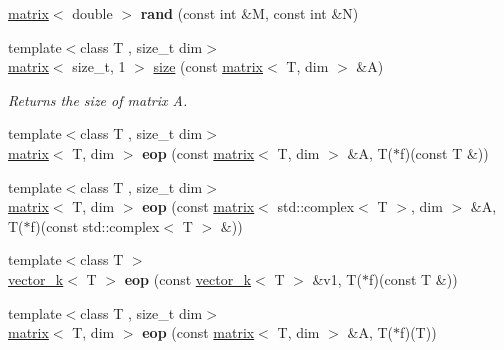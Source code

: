 \begin{DoxyCompactItemize}
\item 
\hypertarget{namespacekeycpp_ae5c4b142a4101e9bb1df9f19efaf7d2f}{\hyperlink{classkeycpp_1_1matrix}{matrix}$<$ double $>$ {\bfseries rand} (const int \&M, const int \&N)}\label{namespacekeycpp_ae5c4b142a4101e9bb1df9f19efaf7d2f}

\item 
{\footnotesize template$<$class T , size\-\_\-t dim$>$ }\\\hyperlink{classkeycpp_1_1matrix}{matrix}$<$ size\-\_\-t, 1 $>$ \hyperlink{namespacekeycpp_acfe17126168656af54ae76ab6c487407}{size} (const \hyperlink{classkeycpp_1_1matrix}{matrix}$<$ T, dim $>$ \&A)
\begin{DoxyCompactList}\small\item\em Returns the size of matrix A. \end{DoxyCompactList}\item 
\hypertarget{namespacekeycpp_ac999bd518fb456aa9a4fbd2c04f007de}{{\footnotesize template$<$class T , size\-\_\-t dim$>$ }\\\hyperlink{classkeycpp_1_1matrix}{matrix}$<$ T, dim $>$ {\bfseries eop} (const \hyperlink{classkeycpp_1_1matrix}{matrix}$<$ T, dim $>$ \&A, T($\ast$f)(const T \&))}\label{namespacekeycpp_ac999bd518fb456aa9a4fbd2c04f007de}

\item 
\hypertarget{namespacekeycpp_a0865e2c884915d6ed0e3ef7bf73438b0}{{\footnotesize template$<$class T , size\-\_\-t dim$>$ }\\\hyperlink{classkeycpp_1_1matrix}{matrix}$<$ T, dim $>$ {\bfseries eop} (const \hyperlink{classkeycpp_1_1matrix}{matrix}$<$ std\-::complex$<$ T $>$, dim $>$ \&A, T($\ast$f)(const std\-::complex$<$ T $>$ \&))}\label{namespacekeycpp_a0865e2c884915d6ed0e3ef7bf73438b0}

\item 
\hypertarget{namespacekeycpp_a6c6542964c7aaaccbee336567f64c03c}{{\footnotesize template$<$class T $>$ }\\\hyperlink{classkeycpp_1_1vector__k}{vector\-\_\-k}$<$ T $>$ {\bfseries eop} (const \hyperlink{classkeycpp_1_1vector__k}{vector\-\_\-k}$<$ T $>$ \&v1, T($\ast$f)(const T \&))}\label{namespacekeycpp_a6c6542964c7aaaccbee336567f64c03c}

\item 
\hypertarget{namespacekeycpp_a46e135aeca12d58b9a084413bf571783}{{\footnotesize template$<$class T , size\-\_\-t dim$>$ }\\\hyperlink{classkeycpp_1_1matrix}{matrix}$<$ T, dim $>$ {\bfseries eop} (const \hyperlink{classkeycpp_1_1matrix}{matrix}$<$ T, dim $>$ \&A, T($\ast$f)(T))}\label{namespacekeycpp_a46e135aeca12d58b9a084413bf571783}


\end{DoxyCompactItemize}
